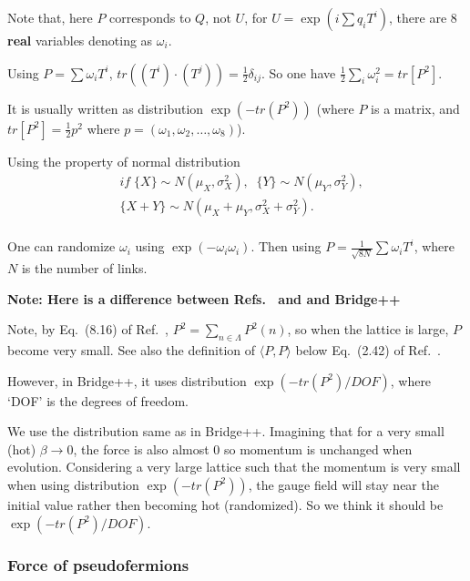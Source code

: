 Note that, here $P$ corresponds to $Q$, not $U$, for $U=\exp\left(i \sum q_i T^i\right)$, there are $8$ \textbf{real} variables denoting as $\omega _i$.

Using $P=\sum \omega _i T^i$, $tr((T^i)\cdot (T^j))=\frac{1}{2}\delta _{ij}$. So one have $\frac{1}{2}\sum _i\omega _i^2=tr[P^2]$.

It is usually written as distribution $\exp \left(-tr(P^2)\right)$ (where $P$ is a matrix, and $tr[P^2]=\frac{1}{2}p^2$ where $p=(\omega_1,\omega_2,\ldots ,\omega _8)$).

Using the property of normal distribution
\begin{equation}
\begin{split}
&if\; \{X\}\sim N(\mu _X, \sigma _X^2),\;\; \{Y\}\sim N(\mu _Y, \sigma _Y^2),\\
&\{X+Y\}\sim N(\mu _X+\mu _Y, \sigma _X^2+\sigma _Y^2).\\
\end{split}
\end{equation}

One can randomize $\omega _i$ using $\exp \left(-\omega_i\omega_i\right)$. Then using $P=\frac{1}{\sqrt{8N}}\sum \omega _i T^i$, where $N$ is the number of links.

\textcolor[rgb]{0,0,1}{\textbf{Note: Here is a difference between Refs.~\cite{latticeqcdbook2010} and \cite{latticeqcdbook2017} and Bridge++~\cite{bridge}}}

Note, by Eq.~(8.16) of Ref.~\cite{latticeqcdbook2010}, $P^2=\sum _{n\in \Lambda}P^2(n)$, so when the lattice is large, $P$ become very small. See also the definition of $\langle P,P\rangle$ below Eq.~(2.42) of Ref.~\cite{latticeqcdbook2017}.

However, in Bridge++, it uses distribution $\exp \left(-tr(P^2)/DOF\right)$, where `DOF' is the degrees of freedom.

We use the distribution same as in Bridge++. Imagining that for a very small (hot) $\beta \to 0$, the force is also almost $0$ so momentum is unchanged when evolution. Considering a very large lattice such that the momentum is very small when using distribution $\exp \left(-tr(P^2)\right)$, the gauge field will stay near the initial value rather then becoming hot (randomized). So we think it should be $\exp \left(-tr(P^2)/DOF\right)$.

\subsubsection{\label{forceOfPseudofermions}Force of pseudofermions}

